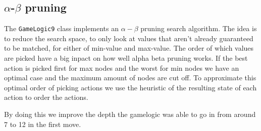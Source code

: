 \subsection{$\alpha$-$\beta$ pruning}
The \texttt{GameLogic9} class implements an $\alpha-\beta$ pruning search algorithm. The idea is to reduce the search space, to only look at values that aren't already guaranteed to be matched, for either of min-value and max-value. The order of which values are picked have a big inpact on how well alpha beta pruning works. If the best action is picked first for max nodes and the worst for min nodes we have an optimal case and the maximum amount of nodes are cut off. To approximate this optimal order of picking actions we use the heuristic of the resulting state of each action to order the actions. 

By doing this we improve the depth the gamelogic was able to go in from around 7 to 12 in the first move.